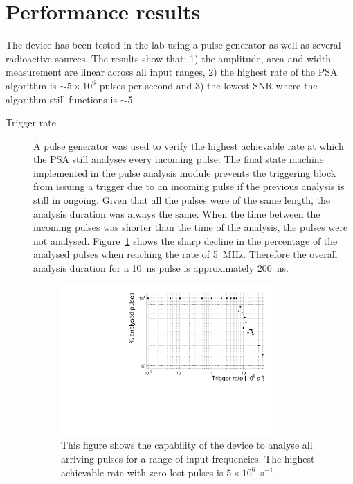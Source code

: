 \section{Performance results}
\label{sec:perres}
The device has been tested in the lab using a pulse generator as well as several radioactive sources. The results show that: 1) the amplitude, area and width measurement are linear across all input ranges, 2) the highest rate of the PSA algorithm is $\sim5\times10^6$ pulses per second and 3) the lowest SNR where the algorithm still functions is $\sim$5.  

\begin{description}
\item[Trigger rate]
A pulse generator was used to verify the highest achievable rate at which the PSA still analyses every incoming pulse. The final state machine implemented in the pulse analysis module prevents the triggering block from issuing a trigger due to an incoming pulse if the previous analysis is still in ongoing. Given that all the pulses were of the same length, the analysis duration was always the same. When the time between the incoming pulses was shorter than the time of the analysis, the pulses were not analysed. Figure~\ref{fig:trigrate} shows the sharp decline in the percentage of the analysed pulses when reaching the rate of 5~MHz. Therefore the overall analysis duration for a 10~ns pulse is approximately 200~ns.

\begin{figure}[!t]
\centering
\includegraphics[width=0.8\textwidth]{../scripts/05_current_monitoring/PulseGenTests/plots/freq}
\caption{This figure shows the capability of the device to analyse all arriving pulses for a range of input frequencies. The highest achievable rate with zero lost pulses is $5\times10^6$~s$^{-1}$.}
\label{fig:trigrate}
\end{figure}


\end{description}
